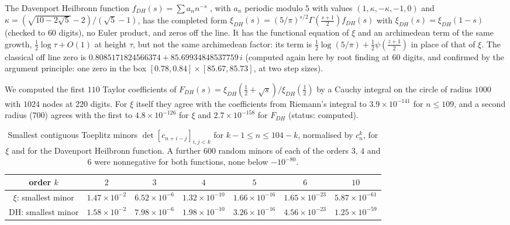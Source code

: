 The Davenport Heilbronn function $f_{DH}(s)=\sum a_nn^{-s}$ \cite{DH36}, with $a_n$ periodic modulo $5$ with values $(1,\kappa,-\kappa,-1,0)$ and $\kappa=(\sqrt{10-2\sqrt5}-2)/(\sqrt5-1)$, has the completed form $\xi_{DH}(s)=(5/\pi)^{s/2}\Gamma(\frac{s+1}2)f_{DH}(s)$ with $\xi_{DH}(s)=\xi_{DH}(1-s)$ (checked to $60$ digits), no Euler product, and zeros off the line. It has the functional equation of $\xi$ and an archimedean term of the same growth, $\frac12\log\tau+O(1)$ at height $\tau$, but not the same archimedean factor: its term is $\frac12\log(5/\pi)+\frac12\psi(\frac{z+1}2)$ in place of that of $\xi$. The classical off line zero is $0.8085171824566374+85.69934848537759\,i$ \cite{Spira94} (computed again here by root finding at $60$ digits, and confirmed by the argument principle: one zero in the box $[0.78,0.84]\times[85.67,85.73]$, at two step sizes).

We computed the first $110$ Taylor coefficients of $F_{DH}(s)=\xi_{DH}(\frac12+\sqrt s)/\xi_{DH}(\frac12)$ by a Cauchy integral on the circle of radius $1000$ with $1024$ nodes at $220$ digits. For $\xi$ itself they agree with the coefficients from Riemann's integral to $3.9\times10^{-141}$ for $n\le109$, and a second radius ($700$) agrees with the first to $4.8\times10^{-126}$ for $\xi$ and $2.7\times10^{-158}$ for $F_{DH}$ (status: computed).

\begin{table}[h]
\centering
\scriptsize\setlength{\tabcolsep}{2.5pt}\begin{tabular}{ccccccc}
\toprule
order $k$ & $2$ & $3$ & $4$ & $5$ & $6$ & $10$\\
\midrule
$\xi$: smallest minor & $1.47\times10^{-2}$ & $6.52\times10^{-6}$ & $1.32\times10^{-10}$ & $1.66\times10^{-16}$ & $1.65\times10^{-23}$ & $5.87\times10^{-61}$\\
DH: smallest minor & $1.58\times10^{-2}$ & $7.98\times10^{-6}$ & $1.98\times10^{-10}$ & $3.26\times10^{-16}$ & $4.56\times10^{-23}$ & $1.25\times10^{-59}$\\
\bottomrule
\end{tabular}
\caption{Smallest contiguous Toeplitz minors $\det[c_{n+i-j}]_{i,j<k}$ for $k-1\le n\le104-k$, normalised by $c_n^k$, for $\xi$ and for the Davenport Heilbronn function. A further $600$ random minors of each of the orders $3$, $4$ and $6$ were nonnegative for both functions, none below $-10^{-80}$.}
\label{ht:tab:dh}
\end{table}

